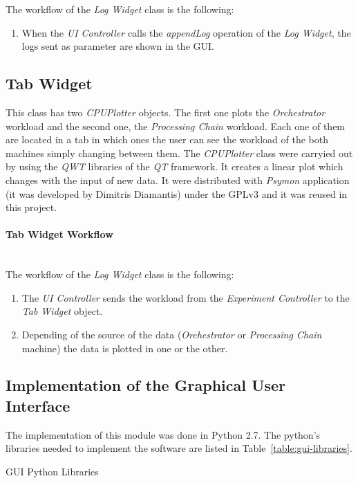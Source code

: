 The workflow of the \emph{Log Widget} class is the following:
\begin{enumerate}
\item When the \emph{UI Controller} calls the \emph{appendLog} operation of the \emph{Log Widget}, the logs sent as parameter are shown in the \ac{GUI}.
\end{enumerate}

\subsection{Tab Widget}

This class has two \emph{CPUPlotter} objects. The first one plots the \emph{Orchestrator} workload and the second one, the \emph{Processing Chain} workload. Each one of them are located in a tab in which ones the user can see the workload of the both machines simply changing between them.
The \emph{CPUPlotter} class were carryied out by using the \emph{QWT} libraries of the \emph{QT} framework. It creates a linear plot which changes with the input of new data. It were distributed with \emph{Psymon} application (it was developed by Dimitris Diamantis) under the \ac{GPL}v3 and it was reused in this project.

\paragraph{Tab Widget  Workflow}~\\

The workflow of the \emph{Log Widget} class is the following:
\begin{enumerate}
\item The \emph{UI Controller} sends the workload from the \emph{Experiment Controller} to the \emph{Tab Widget} object. 
\item Depending of the source of the data (\emph{Orchestrator} or \emph{Processing Chain} machine) the data is plotted in one or the other.
\end{enumerate}


\subsection{Implementation of the Graphical User Interface}


The implementation of this module was done in Python 2.7. The python's libraries
needed to implement the software are listed in
Table~\ref{table:gui-libraries}.

\begin{table}[!h]
  \centering
  {\small
  
  }
  \caption{GUI Python Libraries}
  \label{table:gui-libraries}
\end{table}

